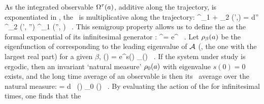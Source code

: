 As the integrated observable $\Omega^{\tau} (a)$, additive along the
trajectory, is exponentiated in , the \evOper\
is multiplicative along the trajectory:
\beq
	\Lop^{\zeit_1 + \zeit_2} (\ssp',\ssp) =
    \int d\ssp'' \Lop^{\zeit_2} (\ssp', \ssp'')
                   \Lop^{\zeit_1} (\ssp'', \ssp) \, .
	\label{eq-SemiGroupKernel}
\eeq
This semigroup property allows us to define the {\evOper} as the formal
exponential of its infinitesimal generator \Aop:
\beq
	\Lop^\zeit = e^{\Aop \zeit} \, .
	\label{eq-EvOpExp}
\eeq
Let $\rho_{\beta} (a)$ be the eigenfunction of
 corresponding to the leading eigenvalue of ${\cal A}$ (\ie, the one
with the largest real part) for a given $\beta$,
\beq
    \left[ \Lop^\zeit \rho_{\beta} \right] (\ssp)
    =
    e^{\zeit s(\beta )} \rho_{\beta}(\ssp)
    \, .
    \label{eq-EigenvalueRel}
\eeq
If the system under study is
ergodic, then an invariant `natural measure' $\rho_0(a)$ with
eigenvalue $s(0) = 0$ exists, and the long time average of an observable is
then its \statesp\ average over the natural measure:
\beq
    \langle \obser \rangle = \int d \ssp \, \obser(\ssp) \rho_0 (\ssp) \, .
    \label{e-obserAvg}
\eeq
By evaluating the action of the {\evOper}  for
infinitesimal times, one finds that the

